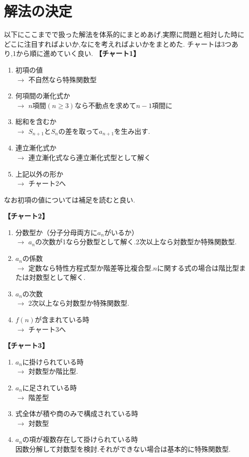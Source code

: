 
  \section{解法の決定}\label{節：解法の決定}
    以下にここまでで扱った解法を体系的にまとめあげ,実際に問題と相対した時にどこに注目すればよいか,なにを考えればよいかをまとめた.
    チャートは3つあり,1から順に進めていく良い.
    \noindent \textbf{【チャート1】}
    \begin{enumerate}
      \item 初項の値\\
            $\rightarrow$ 不自然なら特殊関数型
      \item 何項間の漸化式か\\
            $\rightarrow$ $n$項間$(n\ge3)$なら不動点を求めて$n-1$項間に
      \item 総和を含むか\\
            $\rightarrow$ $S_{n+1}$と$S_n$の差を取って$a_{n+1}$を生み出す.
      \item 連立漸化式か\\
            $\rightarrow$ 連立漸化式なら連立漸化式型として解く
      \item 上記以外の形か\\
            $\rightarrow$ チャート2へ
    \end{enumerate}
    なお初項の値については補足を読むと良い.

    \noindent \textbf{【チャート2】}
    \begin{enumerate}
        \item 分数型か（分子分母両方に$a_n$がいるか）\\
              $\rightarrow$ $a_n$の次数が1なら分数型として解く.2次以上なら対数型か特殊関数型.
        \item $a_n$の係数\\
              $\rightarrow$ 定数なら特性方程式型か階差等比複合型.$n$に関する式の場合は階比型または対数型として解く.
        \item $a_n$の次数\\
              $\rightarrow$ 2次以上なら対数型か特殊関数型.
        \item $f(n)$が含まれている時\\
              $\rightarrow$ チャート3へ
    \end{enumerate}

    \noindent \textbf{【チャート3】}
    \begin{enumerate}
      \item $a_n$に掛けられている時\\
            $\rightarrow$ 対数型か階比型.
      \item $a_n$に足されている時\\
            $\rightarrow$ 階差型
      \item 式全体が積や商のみで構成されている時\\
            $\rightarrow$ 対数型
      \item $a_n$の項が複数存在して掛けられている時\\
            因数分解して対数型を検討.それができない場合は基本的に特殊関数型.
    \end{enumerate}
